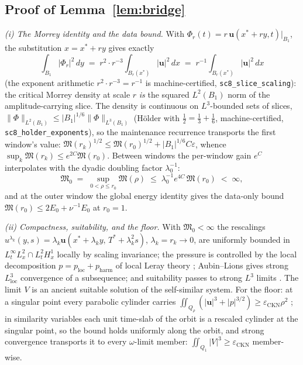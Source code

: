 \documentclass[11pt,letterpaper]{amsart}
\theoremstyle{definition}
\theoremstyle{remark}
\newcommand{\om}{\omega}
\newcommand{\uu}{\boldsymbol{u}}
\newcommand{\norm}[1]{\lVert #1 \rVert}
\newcommand{\abs}[1]{\lvert #1 \rvert}
\begin{document}
\subsection{Proof of Lemma~\ref{lem:bridge}}\label{pf:bridge}
\emph{(i) The Morrey identity and the data bound.} With
$\Phi_r(t)=r\,\uu(x^*+ry,t)|_{B_1}$, the substitution $x=x^*+ry$ gives exactly
\[
\int_{B_1}\abs{\Phi_r}^2\,dy\;=\;r^2\cdot r^{-3}\!\int_{B_r(x^*)}\abs{\uu}^2\,dx
\;=\;r^{-1}\!\int_{B_r(x^*)}\abs{\uu}^2\,dx
\]
(the exponent arithmetic $r^2\cdot r^{-3}=r^{-1}$ is machine-certified,
\texttt{sc8\_slice\_scaling}): the critical Morrey density at scale $r$ \emph{is} the
squared $L^2(B_1)$ norm of the amplitude-carrying slice. The density is continuous on
$L^3$-bounded sets of slices, $\norm{\Phi}_{L^2(B_1)}\le
\abs{B_1}^{1/6}\norm{\Phi}_{L^3(B_1)}$ (H\"older with $\tfrac12=\tfrac13+\tfrac16$,
machine-certified, \texttt{sc8\_holder\_exponents}), so the maintenance recurrence
transports the first window's value: $\mathfrak{M}(r_k)^{1/2}\le
\mathfrak{M}(r_0)^{1/2}+\abs{B_1}^{1/6}C\varepsilon$, whence
$\sup_k\mathfrak{M}(r_k)\le e^{2C}\mathfrak{M}(r_0)$. Between windows the per-window
gain $e^C$ interpolates with the dyadic doubling factor $\lambda_0^{-1}$:
\[
\mathfrak{M}_0\;=\;\sup_{0<\rho\le r_0}\mathfrak{M}(\rho)
\;\le\;\lambda_0^{-1}e^{4C}\,\mathfrak{M}(r_0)\;<\;\infty,
\]
and at the outer window the global energy identity gives the data-only bound
$\mathfrak{M}(r_0)\le2E_0+\nu^{-1}E_0$ at $r_0=1$.

\emph{(ii) Compactness, suitability, and the floor.} With $\mathfrak{M}_0<\infty$ the
rescalings $u^{\lambda_k}(y,s)=\lambda_k\uu(x^*+\lambda_ky,\,T^*+\lambda_k^2s)$,
$\lambda_k=r_k\to0$, are uniformly bounded in
$L^\infty_tL^2_x\cap L^2_tH^1_x$ locally by scaling invariance; the pressure is
controlled by the local decomposition $p=p_{\mathrm{loc}}+p_{\mathrm{harm}}$ of local
Leray theory \cite{LemarieRieusset2002,KikuchiSeregin2007}; Aubin--Lions gives strong
$L^3_{\mathrm{loc}}$ convergence of a subsequence; and suitability passes to strong
$L^3$ limits \cite{Lin1998,Scheffer1976,CKN1982}. The limit $V$ is an ancient
suitable solution of the self-similar system. For the floor: at a singular point
every parabolic cylinder carries
$\iint_{Q_\rho}(\abs{\uu}^3+\abs{p}^{3/2})\ge\varepsilon_{\mathrm{CKN}}\rho^2$
\cite{CKN1982,Lin1998}; in similarity variables each unit time-slab of the orbit is a
rescaled cylinder at the singular point, so the bound holds uniformly along the
orbit, and strong convergence transports it to every $\om$-limit member:
$\iint_{Q_1}\abs{V}^3\ge\varepsilon_{\mathrm{CKN}}$ member-wise.
\end{document}
